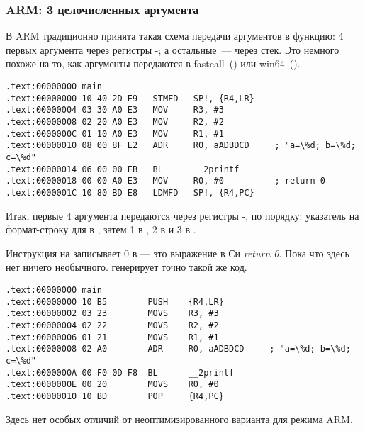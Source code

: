 \subsubsection{ARM: 3 целочисленных аргумента}

В ARM традиционно принята такая схема передачи аргументов в функцию: 
4 первых аргумента через регистры -; а остальные~--- через стек.
Это немного похоже на то, как аргументы передаются в 
fastcall~() или win64~().


\mysubparagraph{\NonOptimizingKeilVI (\ARMMode)}

\begin{lstlisting}[caption=\NonOptimizingKeilVI (\ARMMode),style=customasmARM]
.text:00000000 main
.text:00000000 10 40 2D E9   STMFD   SP!, {R4,LR}
.text:00000004 03 30 A0 E3   MOV     R3, #3
.text:00000008 02 20 A0 E3   MOV     R2, #2
.text:0000000C 01 10 A0 E3   MOV     R1, #1
.text:00000010 08 00 8F E2   ADR     R0, aADBDCD     ; "a=\%d; b=\%d; c=\%d"
.text:00000014 06 00 00 EB   BL      __2printf
.text:00000018 00 00 A0 E3   MOV     R0, #0          ; return 0
.text:0000001C 10 80 BD E8   LDMFD   SP!, {R4,PC}
\end{lstlisting}

Итак, первые 4 аргумента передаются через регистры -, по порядку: 
указатель на формат-строку для \printf
в , затем 1 в , 2 в  и 3 в .

Инструкция на  записывает 0 в  --- это выражение в Си \emph{return 0}.
Пока что здесь нет ничего необычного.
\OptimizingKeilVI генерирует точно такой же код.

\mysubparagraph{\OptimizingKeilVI (\ThumbMode)}

\begin{lstlisting}[caption=\OptimizingKeilVI (\ThumbMode),style=customasmARM]
.text:00000000 main
.text:00000000 10 B5        PUSH    {R4,LR}
.text:00000002 03 23        MOVS    R3, #3
.text:00000004 02 22        MOVS    R2, #2
.text:00000006 01 21        MOVS    R1, #1
.text:00000008 02 A0        ADR     R0, aADBDCD     ; "a=\%d; b=\%d; c=\%d"
.text:0000000A 00 F0 0D F8  BL      __2printf
.text:0000000E 00 20        MOVS    R0, #0
.text:00000010 10 BD        POP     {R4,PC}
\end{lstlisting}

Здесь нет особых отличий от неоптимизированного варианта для режима ARM.
\label{ARM_B_to_printf}

